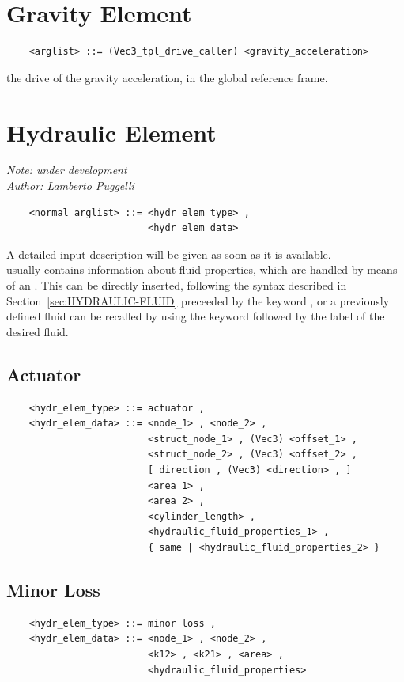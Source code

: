 \section{Gravity Element}
\begin{verbatim}
    <arglist> ::= (Vec3_tpl_drive_caller) <gravity_acceleration>
\end{verbatim}
the drive of the gravity acceleration, in the global reference frame.




\section{Hydraulic Element}\label{sec:HYDRAULIC-ELEMENT}
{\em 
    Note: under development \\
    Author: Lamberto Puggelli
}
\begin{verbatim}
    <normal_arglist> ::= <hydr_elem_type> , 
                         <hydr_elem_data>
\end{verbatim}
A detailed input description will be given as soon as it is available. \\
 usually contains information about fluid
properties, which are handled by means of an .
This can be directly inserted, following the syntax described in
Section~\ref{sec:HYDRAULIC-FLUID} preceeded by the keyword , or a
previously defined fluid can be recalled by using the keyword 
 followed by the label of the desired fluid.

\subsection{Actuator}
\begin{verbatim}
    <hydr_elem_type> ::= actuator ,
    <hydr_elem_data> ::= <node_1> , <node_2> , 
                         <struct_node_1> , (Vec3) <offset_1> ,
                         <struct_node_2> , (Vec3) <offset_2> ,
                         [ direction , (Vec3) <direction> , ]
                         <area_1> ,
                         <area_2> ,
                         <cylinder_length> ,
                         <hydraulic_fluid_properties_1> ,
                         { same | <hydraulic_fluid_properties_2> }
\end{verbatim}

\subsection{Minor Loss}
\begin{verbatim}
    <hydr_elem_type> ::= minor loss ,
    <hydr_elem_data> ::= <node_1> , <node_2> ,
                         <k12> , <k21> , <area> ,
                         <hydraulic_fluid_properties>
\end{verbatim}

